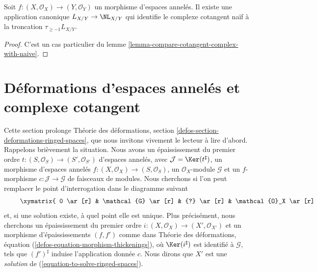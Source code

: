 \begin{lemma}
\label{lemma-compare-cotangent-complex-with-naive-ringed-spaces}
Soit $f : (X, \mathcal{O}_X) \to (Y, \mathcal{O}_Y)$ un morphisme d'espaces
annelés. Il existe une application canonique $L_{X/Y} \to \NL_{X/Y}$ qui
identifie le complexe cotangent naïf à la troncation
$\tau_{\geq -1}L_{X/Y}$.
\end{lemma}

\begin{proof}
C'est un cas particulier du lemme
\ref{lemma-compare-cotangent-complex-with-naive}.
\end{proof}






\section{Déformations d'espaces annelés et complexe cotangent}
\label{section-deformations-ringed-spaces}

\noindent
Cette section prolonge Théorie des déformations, section
\ref{defos-section-deformations-ringed-spaces}, que nous invitons vivement le
lecteur à lire d'abord. Rappelons brièvement la situation. Nous avons un
épaississement du premier ordre
$t : (S, \mathcal{O}_S) \to (S', \mathcal{O}_{S'})$ d'espaces annelés, avec
$\mathcal{J} = \Ker(t^\sharp)$, un morphisme d'espaces annelés
$f : (X, \mathcal{O}_X) \to (S, \mathcal{O}_S)$, un $\mathcal{O}_X$-module
$\mathcal{G}$ et un $f$-morphisme $c : \mathcal{J} \to \mathcal{G}$ de
faisceaux de modules. Nous cherchons si l'on peut remplacer le point
d'interrogation dans le diagramme suivant
\begin{equation}
\label{equation-to-solve-ringed-spaces}
\vcenter{
\xymatrix{
0 \ar[r] & \mathcal{G} \ar[r] & {?} \ar[r] & \mathcal{O}_X \ar[r] & 0 \\
0 \ar[r] & \mathcal{J} \ar[u]^c \ar[r] & \mathcal{O}_{S'} \ar[u] \ar[r] &
\mathcal{O}_S \ar[u] \ar[r] & 0
}
}
\end{equation}
et, si une solution existe, à quel point elle est unique. Plus précisément,
nous cherchons un épaississement du premier ordre
$i : (X, \mathcal{O}_X) \to (X', \mathcal{O}_{X'})$
et un morphisme d'épaississements $(f, f')$ comme dans Théorie des
déformations, équation (\ref{defos-equation-morphism-thickenings}), où
$\Ker(i^\sharp)$ est identifié à $\mathcal{G}$, tels que $(f')^\sharp$ induise
l'application donnée $c$. Nous dirons que $X'$ est une {\it solution} de
(\ref{equation-to-solve-ringed-spaces}).

